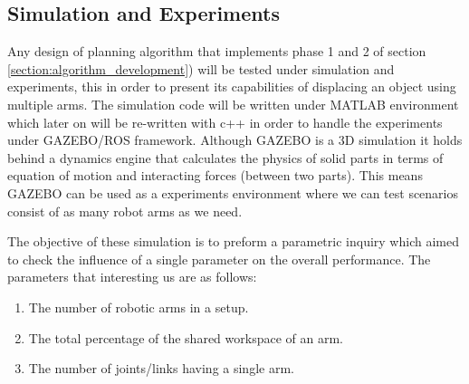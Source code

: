 \subsection{Simulation and Experiments}

Any design of planning algorithm that implements phase 1 and 2 of section \ref{section:algorithm_development}) will be tested under simulation and experiments, this in order to present its capabilities of displacing an object using multiple arms. The simulation code will be written under MATLAB environment which later on will be re-written with c++ in order to handle the experiments under GAZEBO/ROS framework. Although GAZEBO is a 3D simulation it holds behind a dynamics engine that calculates the physics of solid parts in terms of equation of motion and interacting forces (between two parts). This means GAZEBO can be used as a experiments environment where we can test scenarios consist of as many robot arms as we need. 

The objective of these simulation is to preform a parametric inquiry which aimed to check the influence of a single parameter on the overall performance. The parameters that interesting us are as follows:

\begin{enumerate}
\item The number of robotic arms in a setup.
\item The total percentage of the shared workspace of an arm.
\item The number of joints/links having a single arm.
\end{enumerate}


